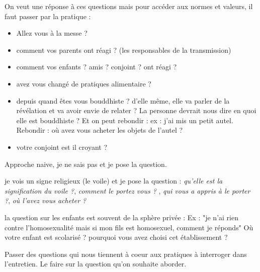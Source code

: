 On veut une réponse à ces questions mais pour accéder aux normes et valeurs, il faut passer par la pratique :
\begin{itemize}
\item Allez vous à la messe ?
\item comment vos parents ont réagi ? (les responsables de la transmission)
\item comment vos enfants ? amis ? conjoint ? ont réagi ?
 

\item avez vous changé de pratiques alimentaire ? 
\item depuis quand êtes vous bouddhiste ? d'elle même, elle va parler de la révélation et va avoir envie de relater ? La personne devrait nous dire en quoi elle est bouddhiste ? Et on peut rebondir : ex : j'ai mis un petit autel. Rebondir : où avez vous acheter les objets de l'autel ?
\item votre conjoint est il croyant ?

\end{itemize}

\begin{Def}
Approche naive, je ne sais pas et je pose la question.
\end{Def}

je vois un signe religieux (le voile) et je pose la question : \textit{qu'elle est la signification du voile ?}, \textit{comment le portez vous ? }, \textit{qui vous a appris à le porter ?}, \textit{où l'avez vous acheter ?}

\begin{Prop}
la question sur les enfants est souvent de la sphère privée : Ex : "je n'ai rien contre l'homosexualité mais si mon fils est homosexuel, comment je réponds"
Où votre enfant est scolarisé ? pourquoi vous avez choisi cet établissement ?

\end{Prop}

\begin{Exo}
Passer des questions qui nous tiennent à coeur aux pratiques à interroger dans l'entretien.
Le faire sur la question qu'on souhaite aborder.
\end{Exo}


